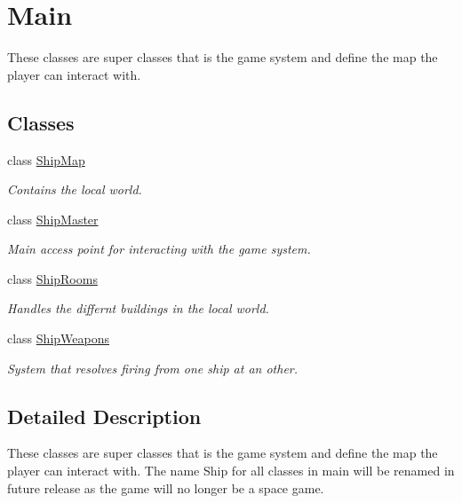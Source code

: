 \hypertarget{group__main}{\section{Main}
\label{group__main}
}


These classes are super classes that is the game system and define the map the player can interact with.  


\subsection*{Classes}
\begin{DoxyCompactItemize}
\item 
class \hyperlink{classShipMap}{Ship\-Map}
\begin{DoxyCompactList}\small\item\em Contains the local world. \end{DoxyCompactList}\item 
class \hyperlink{classShipMaster}{Ship\-Master}
\begin{DoxyCompactList}\small\item\em Main access point for interacting with the game system. \end{DoxyCompactList}\item 
class \hyperlink{classShipRooms}{Ship\-Rooms}
\begin{DoxyCompactList}\small\item\em Handles the differnt buildings in the local world. \end{DoxyCompactList}\item 
class \hyperlink{classShipWeapons}{Ship\-Weapons}
\begin{DoxyCompactList}\small\item\em System that resolves firing from one ship at an other. \end{DoxyCompactList}\end{DoxyCompactItemize}


\subsection{Detailed Description}
These classes are super classes that is the game system and define the map the player can interact with. The name Ship for all classes in main will be renamed in future release as the game will no longer be a space game. 